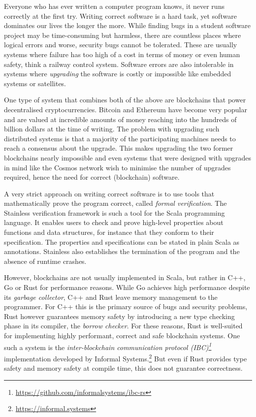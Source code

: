Everyone who has ever written a computer program knows, it never runs
correctly at the first try. Writing correct software is a hard task, yet
software dominates our lives the longer the more. While finding bugs in
a student software project may be time-consuming but harmless, there are
countless places where logical errors and worse, security bugs cannot be
tolerated. These are usually systems where failure has too high of a
cost in terms of money or even human safety, think a railway control
system. Software errors are also intolerable in systems where
\emph{upgrading} the software is costly or impossible like embedded
systems or satellites.

One type of system that combines both of the above are blockchains that power
decentralised cryptocurrencies. Bitcoin \cite{bitcoin} and Ethereum
\cite{ethereum} have become very popular and are valued at incredible amounts of
money reaching into the hundreds of billion dollars at the time of writing. The
problem with upgrading such distributed systems is that a majority of the
participating machines needs to reach a consensus about the upgrade. This makes
upgrading the two former blockchains nearly impossible and even systems that
were designed with upgrades in mind like the Cosmos network \cite{cosmos} wish
to minimise the number of upgrades required, hence the need for correct
(blockchain) software.

A very strict approach on writing correct software is to use tools that
mathematically prove the program correct, called \emph{formal verification}. The
Stainless verification framework \cite{stainless} is such a tool for the Scala
programming language. It enables users to check and prove high-level properties
about functions and data structures, for instance that they conform to their
specification. The properties and specifications can be stated in plain Scala as
annotations. Stainless also establishes the termination of the program and the
absence of runtime crashes.

However, blockchains are not usually implemented in Scala, but rather in C++, Go
or Rust for performance reasons. While Go achieves high performance despite its
\emph{garbage collector}, C++ and Rust leave memory management to the
programmer. For C++ this is the primary source of bugs and security problems,
Rust however guarantees memory safety by introducing a new type checking phase
in its compiler, the \emph{borrow checker}. For these reasons, Rust is
well-suited for implementing highly performant, correct and safe blockchain
systems. One such a system is the \emph{inter-blockchain communication protocol
(IBC)\footnote{\url{https://github.com/informalsystems/ibc-rs}}} implementation
developed by Informal Systems.\footnote{\url{https://informal.systems}} But even
if Rust provides type safety and memory safety at compile time, this does not
guarantee correctness.


